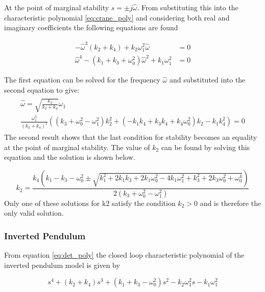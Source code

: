 \documentclass{article}
\begin{document}
At the point of marginal stability $s = \pm j\hat{\omega}$.
From substituting this into the characteristic polynomial \ref{eq:crane_poly} and considering both real and imaginary coefficients the following equations are found

\begin{align}
    - \hat{\omega}^{3} \left(k_{2} + k_{4}\right) + k_{2} \omega_{1}^{2} \hat{\omega}  &= 0 \\
    \hat{\omega}^{4} - \left(k_{1} + k_{3} + \omega_{0}^{2}\right)\hat{\omega}^{2} + k_{1} \omega_{1}^{2} &= 0
\end{align}

The first equation can be solved for the frequency $\hat{\omega}$ and substituted into the second equation to give:
\begin{align}
  \begin{gathered}
    \hat{\omega} = \sqrt{\frac{k_2}{k_2 + k_4}} \omega_1 \label{eq:marginal_stability_frequency}\\
    \frac{\omega_1^2}{(k_2+k_4)^2} \left( \left(k_{3} + \omega_{0}^{2} - \omega_{1}^{2}\right) k_{2}^{2} + \left(- k_{1} k_{4} + k_{3} k_{4} + k_{4} \omega_{0}^{2}\right) k_{2} -  k_{1} k_{4}^{2} \right) = 0
  \end{gathered}
\end{align}
The second result shows that the last condition for stability becomes an equality at the point of marginal stability.
The value of $k_2$ can be found by solving this equation and the solution is shown below.

\begin{equation}
  k_2 = \frac{k_{4} \left(k_{1} - k_{3} - \omega_{0}^{2} \pm \sqrt{k_{1}^{2} + 2 k_{1} k_{3} + 2 k_{1} \omega_{0}^{2} - 4 k_{1} \omega_{1}^{2} + k_{3}^{2} + 2 k_{3} \omega_{0}^{2} + \omega_{0}^{4}}\right)}{2 \left(k_{3} + \omega_{0}^{2} - \omega_{1}^{2}\right)}
  \label{eq:predicted_crane_k2}
\end{equation}
Only one of these solutions for k2 satisfy the condition $k_2 > 0$ and is therefore the only valid solution.

\subsubsection{Inverted Pendulum}

From equation \ref{eq:det_poly} the closed loop characteristic polynomial of the inverted pendulum model is given by

\begin{equation}
  s^{4} + \left(k_{2} + k_{4}\right) s^{3} + \left(k_{1} + k_{3} - \omega_{0}^{2}\right) s^{2} -  k_{2} \omega_{1}^{2} s -  k_{1} \omega_{1}^{2}
  \label{eq:pendulum_poly}
\end{equation}
\end{document}
